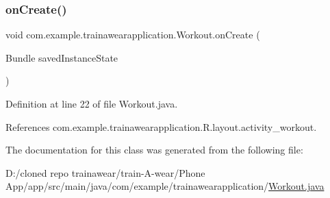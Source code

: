 \subsubsection{\texorpdfstring{onCreate()}{onCreate()}}
{\footnotesize\ttfamily void com.\+example.\+trainawearapplication.\+Workout.\+on\+Create (\begin{DoxyParamCaption}\item[{Bundle}]{saved\+Instance\+State }\end{DoxyParamCaption})\hspace{0.3cm}{\ttfamily [protected]}}



Definition at line 22 of file Workout.\+java.


\begin{DoxyCode}{0}

\end{DoxyCode}


References com.\+example.\+trainawearapplication.\+R.\+layout.\+activity\+\_\+workout.



The documentation for this class was generated from the following file\+:\begin{DoxyCompactItemize}
\item 
D\+:/cloned repo trainawear/train-\/\+A-\/wear/\+Phone App/app/src/main/java/com/example/trainawearapplication/\mbox{\hyperlink{_workout_8java}{Workout.\+java}}\end{DoxyCompactItemize}

